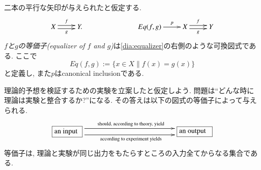 \begin{definition}\label{def:equalizer}


二本の平行な矢印が与えられたと仮定する. 
\begin{align}\label{dia:equalizer}
\xymatrix{X\ar@<.5ex>[r]^f\ar@<-.5ex>[r]_g&Y.}\hspace{1in}\xymatrix{Eq(f,g)\ar[r]^-p&X\ar@<.5ex>[r]^f\ar@<-.5ex>[r]_g&Y}
\end{align}
\emph{$f$と$g$の等価子(equalizer of $f$ and $g$)}は\eqref{dia:equalizer}の右側のような可換図式である. ここで$$Eq(f,g):=\{x\in X\|f(x)=g(x)\}$$と定義し, また$p$はcanonical inclusionである.

\end{definition}

\begin{example}


理論的予想を検証するための実験を立案したと仮定しよう. 問題は``どんな時に理論は実験と整合するか?''になる. その答えは以下の図式の等価子によって与えられる.
$$\xymatrix{
\obox{}{.5in}{an input}\ar@<1ex>[rr]^{\tn{should, according to theory, yield}}\ar@<-1ex>[rr]_{\tn{according to experiment yields}}&\hspace{1in}&\obox{}{.6in}{an output}
}$$
等価子は, 理論と実験が同じ出力をもたらすところの入力全てからなる集合である.

\end{example}

